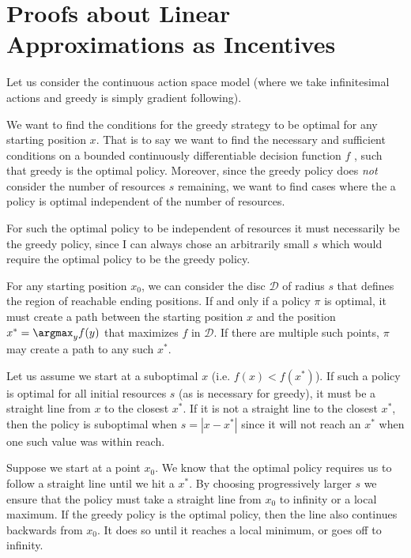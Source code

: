 
\section{Proofs about Linear Approximations as Incentives}


Let us consider the continuous action space model (where we take infinitesimal actions and greedy is simply gradient following). 

We want to find the conditions for the greedy strategy to be optimal for any starting position $x$. That is to say we want to find the necessary and sufficient conditions on a bounded continuously differentiable decision function $f$ , such that greedy is the optimal policy. Moreover, since the greedy policy does \textit{not} consider the number of resources $s$ remaining, we want to find cases where the a policy is optimal independent of the number of resources. 

For such the optimal policy to be independent of resources it must necessarily be the greedy policy, since I can always chose an arbitrarily small $s$ which would require the optimal policy to be the greedy policy.

For any starting position $x_0$, we can consider the disc $\mathcal{D}$ of radius $s$ that defines the region of reachable ending positions. If and only if a policy $\pi$ is optimal, it must create a path between the starting position $x$ and the position $x^* = \argmax_{y} f(y)$ that maximizes $f$ in $\mathcal{D}$. If there are multiple such points, $\pi$ may create a path to any such $x^*$.

Let us assume we start at a suboptimal $x$ (i.e. $f(x) < f(x^*)$). If such a policy is optimal for all initial resources $s$ (as is necessary for greedy), it must be a straight line from $x$ to the closest $x^*$. If it is not a straight line to the closest $x^*$, then the policy is suboptimal when $s=|x-x^*|$ since it will not reach an $x^*$ when one such value was within reach.

Suppose we start at a point $x_0$. We know that the optimal policy requires us to follow a straight line until we hit a $x^*$. By choosing progressively larger $s$ we ensure that the policy must take a straight line from $x_0$ to infinity or a local maximum. If the greedy policy is the optimal policy, then the line also continues backwards from $x_0$. It does so until it reaches a local minimum, or goes off to infinity.

